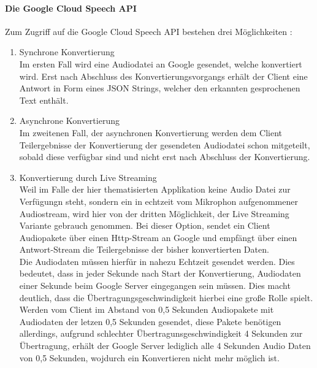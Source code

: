 \paragraph{Die Google Cloud Speech API}
Zum Zugriff auf die Google Cloud Speech API bestehen drei Möglichkeiten \cite{google_apis_2017}:
\begin{enumerate}
	\item Synchrone Konvertierung\\
	Im ersten Fall wird eine Audiodatei an Google gesendet, welche konvertiert wird. Erst nach Abschluss des Konvertierungsvorgangs erhält der Client eine Antwort in Form eines JSON Strings, welcher den erkannten gesprochenen Text enthält.
	\item Asynchrone Konvertierung\\
	Im zweitenen Fall, der asynchronen Konvertierung werden dem Client Teilergebnisse der Konvertierung der gesendeten Audiodatei schon mitgeteilt, sobald diese verfügbar sind und nicht erst nach Abschluss der Konvertierung.
	\item Konvertierung durch Live Streaming\\
	Weil im Falle der hier thematisierten Applikation keine Audio Datei zur Verfügungn steht, sondern ein in echtzeit vom Mikrophon aufgenommener Audiostream, wird hier von der dritten Möglichkeit, der Live Streaming Variante gebrauch genommen. Bei dieser Option, sendet ein Client Audiopakete über einen Http-Stream an Google und empfängt über einen Antwort-Stream die Teilergebnisse der bisher konvertierten Daten.\\
	Die Audiodaten müssen hierfür in nahezu Echtzeit gesendet werden. Dies bedeutet, dass in jeder Sekunde nach Start der Konvertierung, Audiodaten einer Sekunde beim Google Server eingegangen sein müssen. Dies macht deutlich, dass die Übertragungsgeschwindigkeit hierbei eine große Rolle spielt. Werden vom Client im Abstand von 0,5 Sekunden Audiopakete mit Audiodaten der letzen 0,5 Sekunden gesendet, diese Pakete benötigen allerdings, aufgrund schlechter Übertragunsgeschwindigkeit 4 Sekunden zur Übertragung, erhält der Google Server lediglich alle 4 Sekunden Audio Daten von 0,5 Sekunden, wojdurch ein Konvertieren nicht mehr möglich ist.
\end{enumerate}
